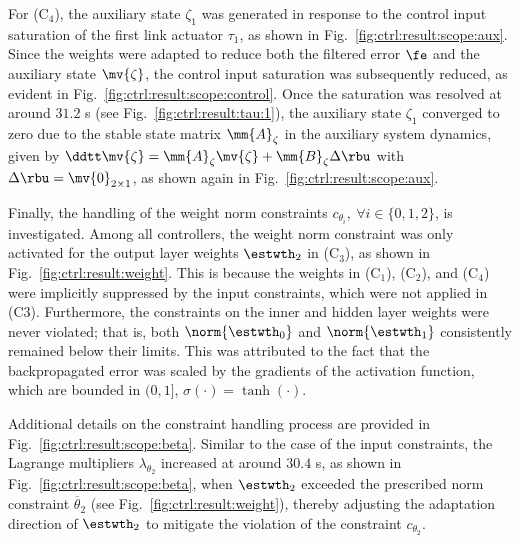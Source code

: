 \documentclass[letterpaper, journal]{IEEEtran}
\begin{document}
For (C$_4$), the auxiliary state $\zeta_1$ was generated in response to the control input saturation of the first link actuator $\tau_1$, as shown in Fig.~\ref{fig:ctrl:result:scope:aux}.
Since the weights were adapted to reduce both the filtered error $\fe$ and the auxiliary state $\mv{\zeta}$, the control input saturation was subsequently reduced, as evident in Fig.~\ref{fig:ctrl:result:scope:control}.
Once the saturation was resolved at around $31.2$ s (see Fig.~\ref{fig:ctrl:result:tau:1}), the auxiliary state $\zeta_1$ converged to zero due to the stable state matrix $\mm{A}_\zeta$ in the auxiliary system dynamics, given by $\ddtt\mv{\zeta} = \mm{A}_\zeta \mv{\zeta} + \mm{B}_\zeta \Delta\rbu$ with $\Delta\rbu=\mv{0}_{2\times1}$, as shown again in Fig.~\ref{fig:ctrl:result:scope:aux}.

\hfill 

Finally, the handling of the weight norm constraints $c_{\theta_i},\ \forall i\in\{0,1,2\}$, is investigated. 
Among all controllers, the weight norm constraint was only activated for the output layer weights $\estwth_2$ in (C$_3$), as shown in Fig.~\ref{fig:ctrl:result:weight}. 
This is because the weights in (C$_1$), (C$_2$), and (C$_4$) were implicitly suppressed by the input constraints, which were not applied in (C3).
Furthermore, the constraints on the inner and hidden layer weights were never violated; that is, both $\norm{\estwth_0}$ and $\norm{\estwth_1}$ consistently remained below their limits.
This was attributed to the fact that the backpropagated error was scaled by the gradients of the activation function, which are bounded in $(0,1]$, \ie $\sigma(\cdot)=\tanh(\cdot)$.

Additional details on the constraint handling process are provided in Fig.~\ref{fig:ctrl:result:scope:beta}. 
Similar to the case of the input constraints, the Lagrange multipliers $\lambda_{\theta_2}$ increased at around $30.4$ s, as shown in Fig.~\ref{fig:ctrl:result:scope:beta}, when $\estwth_2$ exceeded the prescribed norm constraint $\overline\theta_2$ (see Fig.~\ref{fig:ctrl:result:weight}), thereby adjusting the adaptation direction of $\estwth_2$ to mitigate the violation of the constraint $c_{\theta_2}$.

\end{document}
